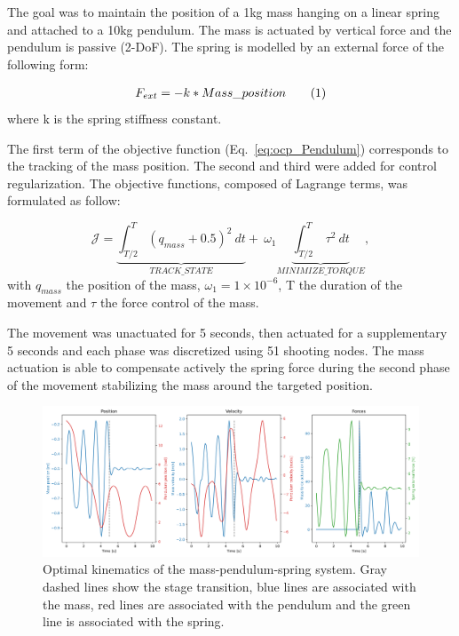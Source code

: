 The goal was to maintain the position of a 1kg mass hanging on a linear spring and attached to a 10kg pendulum.
The mass is actuated by vertical force and the pendulum is passive (2-DoF).
The spring is modelled by an external force of the following form:

\[
\begin{aligned}
F_{ext} = -k*Mass\_position
\end{aligned}
\addtag
\label{eq:f_ext}
\]
where k is the spring stiffness constant.


 
The first term of the objective function (Eq.~\ref{eq:ocp_Pendulum}) corresponds to the tracking of the mass position.
The second and third were added for control regularization.
The objective functions, composed of Lagrange terms, was formulated as follow:


\[\label{eq:ocp_Pendulum}
\mathcal{J} = \underbrace{\int_{T/2}^T (q_{mass} + 0.5)^2~dt}_{TRACK\_STATE}  +~\omega_1 \underbrace{\int_{T/2}^T ~\tau^2~dt}_{MINIMIZE\_ TORQUE},
\]
\noindent with $q_{mass}$ the position of the mass, $\omega_1 = 1\times 10^{-6}$, T the duration of the movement and $\tau$ the force control of the mass.


The movement was unactuated for 5 seconds, then actuated for a supplementary 5 seconds and each phase was discretized using 51 shooting nodes.
The mass actuation is able to compensate actively the spring force during the second phase of the movement stabilizing the mass around the targeted position.


\begin{figure}[t!]
\centering
\includegraphics[width=\textwidth]{figures/Mass_Pendulum_Fext.png}
\caption{Optimal kinematics of the mass-pendulum-spring system. Gray dashed lines show the stage transition, blue lines are associated with the mass, red lines are associated with the pendulum and the green line is associated with the spring.}
\label{fig:Mass_Pendulum_Fext_graphs}
\end{figure}














